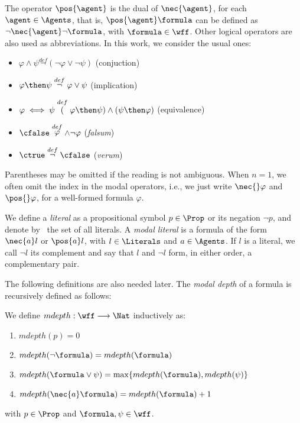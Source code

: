 The operator $\pos{\agent}$ is the dual of $\nec{\agent}$, for each $\agent \in
\Agents$, that is, $\pos{\agent} \formula$ can be defined as $\neg \nec{\agent} \neg
\formula$, with $\formula \in \wff$. Other logical operators are also used as abbreviations.
In this work, we consider the usual ones:
\begin{itemize}
    \item $\varphi \wedge \psi \stackrel{def} \neg(\neg \varphi \lor \neg \psi)$ (conjuction)
    \item $\varphi \then \psi \stackrel{def} \neg \varphi \lor \psi$ (implication)
    \item $\varphi \iff \psi \stackrel{def} (\varphi \then \psi) \land (\psi \then \varphi)$ (equivalence)
    \item $\cfalse \stackrel{def} \varphi \wedge \neg \varphi$ (\emph{falsum})
    \item $\ctrue \stackrel{def} \neg \cfalse$ (\emph{verum}) 
\end{itemize}

Parentheses may be omitted if the reading is not ambiguous.  When $n = 1$, we
often omit the index in the modal operators, i.e., we just write $\nec{}
\varphi$ and $\pos{}\varphi$, for a well-formed formula $\varphi$. 

We define a \emph{literal} as a propositional symbol $p \in \Prop$ or its negation $\neg
p$, and denote by \Literals~the set of all literals. A \emph{modal literal} is a
formula of the form $\nec{a} l$ or $\pos{a} l$, with $l \in \Literals$ and $a
\in \Agents$. If $l$ is a literal, we call $\neg l$ its complement and say that
$l$ and $\neg l$ form, in either order, a complementary pair.

The following definitions are also needed later. The
\emph{modal depth} of a formula is recursively defined as follows:

\begin{definition}
    We define $mdepth : \wff \longrightarrow \Nat$ inductively as:
    \begin{enumerate}
        \item $mdepth(p) = 0$ 
        \item $mdepth(\neg \formula) = mdepth(\formula)$
        \item $mdepth(\formula \lor \psi) = \max\{mdepth(\formula), mdepth(\psi)\}$
        \item $mdepth(\nec{a} \formula) = mdepth(\formula) + 1$
    \end{enumerate}
    with $p \in \Prop$ and $\formula, \psi \in \wff$.
\end{definition}

